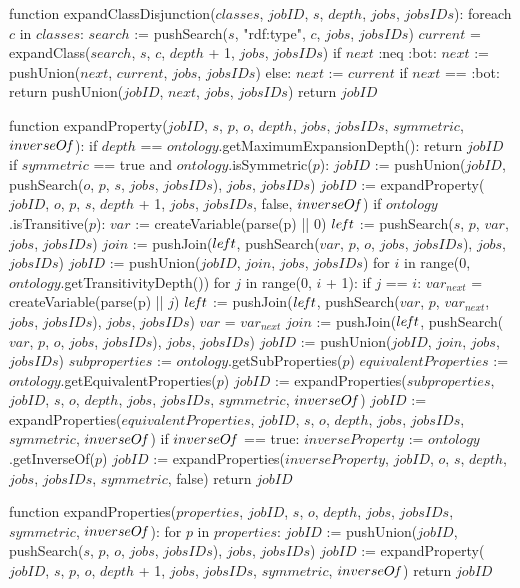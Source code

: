 function expandClassDisjunction($classes$, $jobID$, $s$, $depth$, $jobs$, $jobsIDs$):
    foreach $c$ in $classes$:
        $search$ := pushSearch($s$, "rdf:type", $c$, $jobs$, $jobsIDs$)
        $current$ = expandClass($search$, $s$, $c$, $depth$ + 1, $jobs$, $jobsIDs$)
        if $next$ :neq :bot:
            $next$ := pushUnion($next$, $current$, $jobs$, $jobsIDs$)
        else:
            $next$ := $current$
    if $next$ == :bot:
        return pushUnion($jobID$, $next$, $jobs$, $jobsIDs$)
    return $jobID$

function expandProperty($jobID$, $s$, $p$, $o$, $depth$, $jobs$, $jobsIDs$, $symmetric$, $inverseO\textrm{\emph{f}}$):
    if $depth$ == $ontology$.getMaximumExpansionDepth():
        return $jobID$
    if $symmetric$ == true and $ontology$.isSymmetric($p$):
        $jobID$ := pushUnion($jobID$, pushSearch($o$, $p$, $s$, $jobs$, $jobsIDs$), $jobs$, $jobsIDs$)
        $jobID$ := expandProperty($jobID$, $o$, $p$, $s$, $depth$ + 1, $jobs$, $jobsIDs$, false, $inverseO\textrm{\emph{f}}$)
    if $ontology$.isTransitive($p$):
        $var$ := createVariable(parse(p) || 0)
        $le\textrm{\emph{f}}t$ := pushSearch($s$, $p$, $var$, $jobs$, $jobsIDs$)
        $join$ := pushJoin($le\textrm{\emph{f}}t$, pushSearch($var$, $p$, $o$, $jobs$, $jobsIDs$), $jobs$, $jobsIDs$)
        $jobID$ := pushUnion($jobID$, $join$, $jobs$, $jobsIDs$)
        for $i$ in range(0, $ontology$.getTransitivityDepth())
            for $j$ in range(0, $i$ + 1):
                if $j$ == $i$: 
                    $var_{next}$ = createVariable(parse(p) || $j$)
                    $le\textrm{\emph{f}}t$ := pushJoin($le\textrm{\emph{f}}t$, pushSearch($var$, $p$, $var_{next}$, $jobs$, $jobsIDs$), $jobs$, $jobsIDs$)
                    $var$ = $var_{next}$
            $join$ := pushJoin($le\textrm{\emph{f}}t$, pushSearch($var$, $p$, $o$, $jobs$, $jobsIDs$), $jobs$, $jobsIDs$)
            $jobID$ := pushUnion($jobID$, $join$, $jobs$, $jobsIDs$)
    $subproperties$ := $ontology$.getSubProperties($p$)
    $equivalentProperties$ := $ontology$.getEquivalentProperties($p$)
    $jobID$ := expandProperties($subproperties$, $jobID$, $s$, $o$, $depth$, $jobs$, $jobsIDs$, $symmetric$, $inverseO\textrm{\emph{f}}$)
    $jobID$ := expandProperties($equivalentProperties$, $jobID$, $s$, $o$, $depth$, $jobs$, $jobsIDs$, $symmetric$, $inverseO\textrm{\emph{f}}$)
    if $inverseO\textrm{\emph{f}}$ == true:
        $inverseProperty$ := $ontology$.getInverseOf($p$)
        $jobID$ := expandProperties($inverseProperty$, $jobID$, $o$, $s$, $depth$, $jobs$, $jobsIDs$, $symmetric$, false)
    return $jobID$

function expandProperties($properties$, $jobID$, $s$, $o$, $depth$, $jobs$, $jobsIDs$, $symmetric$, $inverseO\textrm{\emph{f}}$):
    for $p$ in $properties$:
        $jobID$ := pushUnion($jobID$, pushSearch($s$, $p$, $o$, $jobs$, $jobsIDs$), $jobs$, $jobsIDs$)
        $jobID$ := expandProperty($jobID$, $s$, $p$, $o$, $depth$ + 1, $jobs$, $jobsIDs$, $symmetric$, $inverseO\textrm{\emph{f}}$)
    return $jobID$